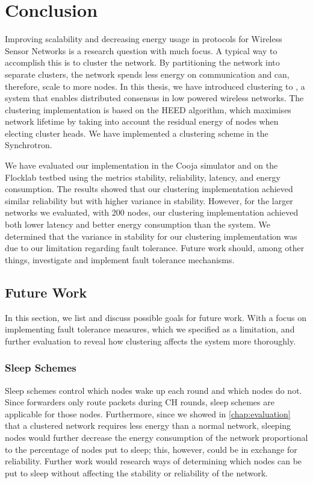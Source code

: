 \chapter{Conclusion}
\label{chap:conclusion}

Improving scalability and decreasing energy usage in protocols for Wireless Sensor Networks is a research question with much focus. A typical way to accomplish this is to cluster the network. By partitioning the network into separate clusters, the network spends less energy on communication and can, therefore, scale to more nodes. In this thesis, we have introduced clustering to \atwo{}, a system that enables distributed consensus in low powered wireless networks. The clustering implementation is based on the HEED algorithm, which maximises network lifetime by taking into account the residual energy of nodes when electing cluster heads. We have implemented a clustering scheme in the \atwo{} Synchrotron.

We have evaluated our implementation in the Cooja simulator and on the Flocklab testbed using the metrics stability, reliability, latency, and energy consumption. The results showed that our clustering implementation achieved similar reliability but with higher variance in stability. However, for the larger networks we evaluated, with 200 nodes, our clustering implementation achieved both lower latency and better energy consumption than the \atwo{} system. We determined that the variance in stability for our clustering implementation was due to our limitation regarding fault tolerance. Future work should, among other things, investigate and implement fault tolerance mechanisms.

\section{Future Work}
\label{sec:future-work}
In this section, we list and discuss possible goals for future work. With a focus on implementing fault tolerance measures, which we specified as a limitation, and further evaluation to reveal how clustering affects the \atwo{} system more thoroughly.


\subsection{Sleep Schemes}
Sleep schemes control which nodes wake up each round and which nodes do not. Since forwarders only route packets during CH rounds, sleep schemes are applicable for those nodes. Furthermore, since we showed in \cref{chap:evaluation} that a  clustered network requires less energy than a normal network, sleeping nodes would further decrease the energy consumption of the network proportional to the percentage of nodes put to sleep; this, however, could be in exchange for reliability. Further work would research ways of determining which nodes can be put to sleep without affecting the stability or reliability of the network.

